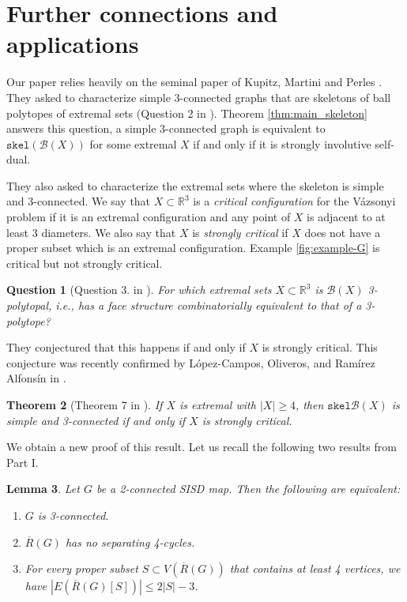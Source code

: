 \documentclass{article}
\newtheorem{theorem}{Theorem}[section]
\newtheorem{lemma}[theorem]{Lemma}
\newtheorem{question}[theorem]{Question}
\newcounter{example}
\newcommand{\R}[0]{\mathbb{R}}
\newcommand{\Bc}[0]{\mathcal{B}}
\newcommand{\skel}[0]{\mathtt{skel}}
\begin{document}
\section{Further connections and applications}\label{sec:furtherconnections}

Our paper relies heavily on the seminal paper of Kupitz, Martini and Perles \cite{kupitz2010ball}. They asked to characterize  simple 3-connected graphs that are skeletons of ball polytopes of extremal sets (Question 2 in \cite{kupitz2010ball}). Theorem \ref{thm:main_skeleton} answers this question, a simple 3-connected graph is equivalent to $\skel(\Bc(X))$ for some extremal $X$ if and only if it is strongly involutive self-dual.  

They also asked to characterize the extremal sets where the skeleton is simple and 3-connected. We say that $X\subset \R^3$ is a \emph{critical configuration} for the Vázsonyi problem if it is an extremal configuration and any point of $X$ is adjacent to at least 3 diameters. We also say that $X$ is \emph{strongly critical} if $X$ does not have a proper subset which is an extremal configuration. Example \ref{fig:example-G} is critical but not strongly critical.

\begin{question}[Question 3. in \cite{kupitz2010ball}]
     For which extremal sets $X\subset \R^3$ is $\Bc(X)$ 3-polytopal, i.e., has a face structure combinatorially equivalent to that of a 3-polytope?
\end{question}

They conjectured that this happens if and only if $X$ is strongly critical. This conjecture was recently confirmed by López-Campos,  Oliveros, and  Ramírez Alfonsín in \cite{lopez2023borsuk}. 
\begin{theorem}[Theorem 7 in \cite{lopez2023borsuk}]\label{thm:stronglycritical}
    If $X$ is extremal with $|X|\ge 4$, then $\skel\Bc(X)$ is simple and 3-connected if and only if $X$ is strongly critical. 
\end{theorem}
We obtain a new proof of this result. Let us recall the following two results from Part I. 

\begin{lemma}\label{lem:3conequiv}
    Let $G$ be a 2-connected SISD map. Then the following are equivalent:
    \begin{enumerate}
        \item $G$ is 3-connected.
        \item $\overline R(G)$ has no separating 4-cycles.
        \item For every proper subset $S\subset V(\overline R(G))$ that contains at least 4 vertices, we have $|E(\overline R(G)[S])|\le 2|S|-3$.
    \end{enumerate}
    
\end{lemma}
\end{document}
